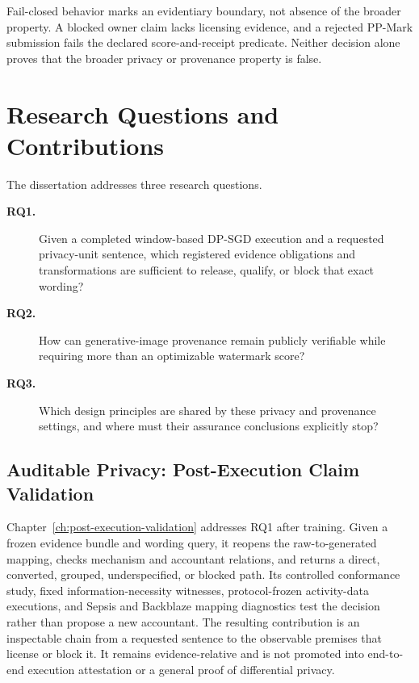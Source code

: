 Fail-closed behavior marks an evidentiary boundary, not absence of the broader
property.  A blocked owner claim lacks licensing evidence, and a rejected PP-Mark
submission fails the declared score-and-receipt predicate.  Neither decision alone
proves that the broader privacy or provenance property is false.


\section{Research Questions and Contributions}
\label{sec:ch1-questions-contributions}

The dissertation addresses three research questions.

\begin{description}
    \item[\textbf{RQ1.}] Given a completed window-based DP-SGD execution and a
    requested privacy-unit sentence, which registered evidence obligations and
    transformations are sufficient to release, qualify, or block that exact
    wording?

    \item[\textbf{RQ2.}] How can generative-image provenance remain publicly
    verifiable while requiring more than an optimizable watermark score?

    \item[\textbf{RQ3.}] Which design principles are shared by these privacy and
    provenance settings, and where must their assurance conclusions explicitly
    stop?
\end{description}

\subsection{Auditable Privacy: Post-Execution Claim Validation}
\label{subsec:ch1-contrib-privacy}

Chapter~\ref{ch:post-execution-validation} addresses RQ1 after training.  Given a
frozen evidence bundle and wording query, it reopens the raw-to-generated mapping,
checks mechanism and accountant relations, and returns a direct, converted,
grouped, underspecified, or blocked path.  Its controlled conformance study, fixed
information-necessity witnesses, protocol-frozen activity-data executions, and
Sepsis and Backblaze mapping diagnostics test the decision rather than propose a
new accountant.  The resulting \AuditablePrivacy{} contribution is an inspectable
chain from a requested sentence to the observable premises that license or block
it.  It remains evidence-relative and is not promoted into end-to-end execution
attestation or a general proof of differential privacy.

